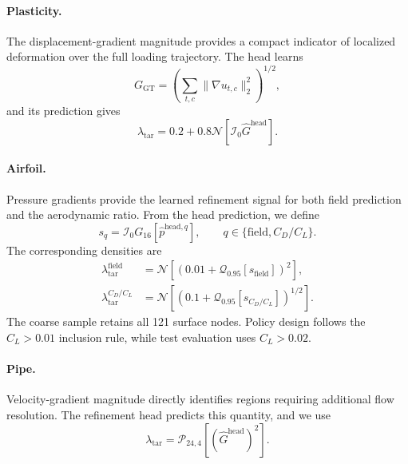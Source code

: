 \documentclass{article}
\begin{document}
\paragraph{Plasticity.}
The displacement-gradient magnitude provides a compact indicator of localized
deformation over the full loading trajectory. The head learns
\[
    G_{\mathrm{GT}}
    =
    \left(
        \sum_{t,c}\|\nabla u_{t,c}\|_2^2
    \right)^{1/2},
\]
and its prediction gives
\begin{equation}
    \lambda_{\mathrm{tar}}
    =0.2+0.8\mathcal{N}\!\left[
        \mathcal{I}_0\widehat G^{\mathrm{head}}
    \right].
    \label{eq:app_ca_plasticity_density}
\end{equation}

\paragraph{Airfoil.}
Pressure gradients provide the learned refinement signal for both field
prediction and the aerodynamic ratio. From the head prediction, we define
\[
    s_q
    =\mathcal{I}_0G_{16}
       [\widehat p^{\mathrm{head},q}],
    \qquad
    q\in\{\mathrm{field},C_D/C_L\}.
\]
The corresponding densities are
\begin{equation}
    \begin{aligned}
    \lambda_{\mathrm{tar}}^{\mathrm{field}}
       &=\mathcal{N}\!\left[
          (0.01+\mathcal{Q}_{0.95}[s_{\mathrm{field}}])^2
          \right],\\
    \lambda_{\mathrm{tar}}^{C_D/C_L}
       &=\mathcal{N}\!\left[
          (0.1+\mathcal{Q}_{0.95}[s_{C_D/C_L}])^{1/2}
          \right].
    \end{aligned}
    \label{eq:app_ca_airfoil_density}
\end{equation}
The coarse sample retains all 121 surface nodes. Policy design follows the
$C_L>0.01$ inclusion rule, while test evaluation uses $C_L>0.02$.

\paragraph{Pipe.}
Velocity-gradient magnitude directly identifies regions requiring additional
flow resolution. The refinement head predicts this quantity, and we use
\begin{equation}
    \lambda_{\mathrm{tar}}
    =\mathcal{P}_{24,4}
       [(\widehat G^{\mathrm{head}})^2].
    \label{eq:app_ca_pipe_density}
\end{equation}
\end{document}

